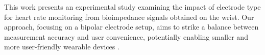 {This work presents an experimental study examining the impact of electrode type for heart rate monitoring from bioimpedance signals obtained on the wrist. Our approach, focusing on a bipolar electrode setup, aims to strike a balance between measurement accuracy and user convenience, potentially enabling smaller and more user-friendly wearable devices \cite{towards}.


}




